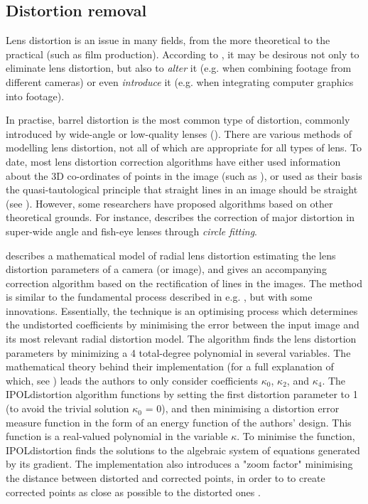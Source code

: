 \subsection{Distortion removal}
\label{sec:distortion-prior}

Lens distortion is an issue in many fields, from the more theoretical to the practical (such as film production). According to \cite{postproduction}, it may be desirous not only to eliminate lens distortion, but also to \emph{alter} it (e.g. when combining footage from different cameras) or even \emph{introduce} it (e.g. when integrating computer graphics into footage).

In practise, barrel distortion is the most common type of distortion, commonly introduced by wide-angle or low-quality lenses (\cite{algebraic-distortion}). There are various methods of modelling lens distortion, not all of which are appropriate for all types of lens. To date, most lens distortion correction algorithms have either used information about the 3D co-ordinates of points in the image (such as \cite{Tsai}), or used as their basis the quasi-tautological principle that straight lines in an image should be straight (see \cite{straightlines}). However, some researchers have proposed algorithms based on other theoretical grounds. For instance, \cite{wide-angle} describes the correction of major distortion in super-wide angle and fish-eye lenses through \emph{circle fitting}.

\cite{algebraic-distortion} describes a mathematical model of radial lens distortion estimating the lens distortion parameters of a camera (or image), and gives an accompanying correction algorithm based on the rectification of lines in the images. The method is similar to the fundamental process described in e.g. \cite{straightlines}, but with some innovations. Essentially, the technique is an optimising process which determines the undistorted coefficients by minimising the error between the input image and its most relevant radial distortion model. The algorithm finds the lens distortion parameters by minimizing a 4 total-degree polynomial in several variables. The mathematical theory behind their implementation (for a full explanation of which, see \cite{algebraic-distortion}) leads the authors to only consider coefficients $\kappa_{0}$, $\kappa_{2}$, and $\kappa_{4}$. The IPOLdistortion algorithm functions by setting the first distortion parameter to 1 (to avoid the trivial solution $\kappa_{0}$ = 0), and then minimising a distortion error measure function in the form of an energy function of the authors' design. This function is a real-valued polynomial in the variable $\kappa$. To minimise the function, IPOLdistortion finds the solutions to the algebraic system of equations generated by its gradient. The implementation also introduces a "zoom factor" minimising the distance between distorted and corrected points, in order to to create corrected points as close as possible to the distorted ones \cite{algebraic-distortion}.
